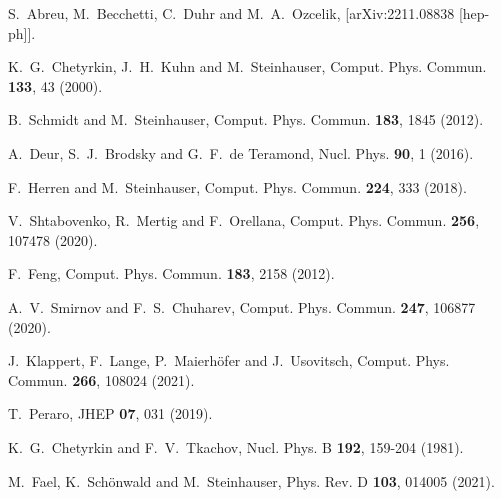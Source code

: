 \documentclass[onecolumn,preprintnumbers,aps,superscriptaddress,nofootinbib,prd,notitlepage]{revtex4-1}
\begin{document}
{\begin{thebibliography}{99}
S.~Abreu, M.~Becchetti, C.~Duhr and M.~A.~Ozcelik,
[arXiv:2211.08838 [hep-ph]].

K.~G.~Chetyrkin, J.~H.~Kuhn and M.~Steinhauser,
Comput. Phys. Commun. \textbf{133}, 43 (2000).

B.~Schmidt and M.~Steinhauser,
Comput. Phys. Commun. \textbf{183}, 1845 (2012).

A.~Deur, S.~J.~Brodsky and G.~F.~de Teramond,
Nucl. Phys. \textbf{90}, 1 (2016).

F.~Herren and M.~Steinhauser,
Comput. Phys. Commun. \textbf{224}, 333 (2018).

V.~Shtabovenko, R.~Mertig and F.~Orellana,
Comput. Phys. Commun. \textbf{256}, 107478 (2020).

F.~Feng,
Comput. Phys. Commun. \textbf{183}, 2158 (2012).

A.~V.~Smirnov and F.~S.~Chuharev,
Comput. Phys. Commun. {\bf 247}, 106877 (2020).

J.~Klappert, F.~Lange, P.~Maierh\"ofer and J.~Usovitsch,
Comput. Phys. Commun. \textbf{266}, 108024 (2021).

T.~Peraro,
JHEP {\bf 07}, 031 (2019).

K.~G.~Chetyrkin and F.~V.~Tkachov,
Nucl. Phys. B {\bf 192}, 159-204 (1981).

M.~Fael, K.~Sch\"onwald and M.~Steinhauser,
Phys. Rev. D \textbf{103}, 014005 (2021).


\end{thebibliography}}
\end{document}
